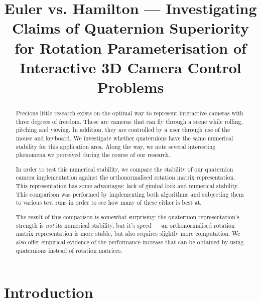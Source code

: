 \documentclass{acm_proc_article-sp}
\title{Euler vs. Hamilton --- Investigating Claims of Quaternion Superiority for Rotation Parameterisation of Interactive 3D Camera Control Problems}
\author{}
\date{}
\begin{document}
\maketitle

\begin{abstract}
Precious little research exists on the optimal way to represent interactive cameras with three degrees of freedom.
These are cameras that can fly through a scene while rolling, pitching and yawing.
In addition, they are controlled by a user through use of the mouse and keyboard.
We investigate whether quaternions have the same numerical stability for this application area.
Along the way, we note several interesting phenomena we perceived during the course of our research.

In order to test this numerical stability, we compare the stability of our quaternion camera implementation against the orthonormalised rotation matrix representation.
This representation has some advantages: lack of gimbal lock and numerical stability.
This comparison was performed by implementing both algorithms and subjecting them to various test runs in order to see how many of these either is best at.

The result of this comparison is somewhat surprising: the quaternion representation's strength is \emph{not} its numerical stability, but it's speed ---
an orthonormalised rotation matrix representation is more stable, but also requires slightly more computation.
We also offer empirical evidence of the performance increase that can be obtained by using quaternions instead of rotation matrices.

\end{abstract}



\section{Introduction}
\end{document}
